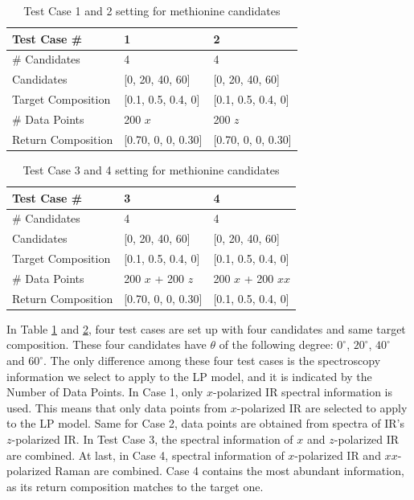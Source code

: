 \begin{table} 
\begin{center}
\begin{tabular}{| l | l | l |  }
\hline
Test Case \# & 1 & 2 \\
\hline
\# Candidates & 4 & 4 \\
\hline
Candidates & [0, 20, 40, 60] & [0, 20, 40, 60] \\
\hline
Target Composition & [0.1, 0.5, 0.4, 0] & [0.1, 0.5, 0.4, 0] \\
\hline
\# Data Points & 200 $x$ & 200 $z$ \\
\hline
Return Composition & [0.70, 0, 0, 0.30] & [0.70, 0, 0, 0.30] \\
\hline
\end{tabular} 
\end{center}
\caption{Test Case 1 and 2 setting for methionine candidates} 
\label{tab:4.1}
\end{table}	

\begin{table} 
\begin{center}
\begin{tabular}{| l | l | l | }
\hline
Test Case \# & 3 & 4 \\
\hline
\# Candidates & 4 & 4  \\
\hline
Candidates & [0, 20, 40, 60] & [0, 20, 40, 60]\\
\hline
Target Composition & [0.1, 0.5, 0.4, 0] & [0.1, 0.5, 0.4, 0]\\
\hline
\# Data Points & 200 $x$ + 200 $z$ & 200 $x$ + 200 $xx$\\
\hline
Return Composition & [0.70, 0, 0, 0.30] & [0.1, 0.5, 0.4, 0]\\
\hline
\end{tabular} 
\end{center}
\caption{Test Case 3 and 4 setting for methionine candidates} 
\label{tab:case3and4}
\end{table}	

In Table \ref{tab:4.1} and \ref{tab:case3and4}, four test cases are set up with four candidates and same target composition. These four candidates have $\theta$ of the following degree: $0^{\circ}$, $20^{\circ}$, $40^{\circ}$ and $60^{\circ}$. The only difference among these four test cases is the spectroscopy information we select to apply to the LP model, and it is indicated by the Number of Data Points. In Case 1, only $x$-polarized IR spectral information is used. This means that only data points from $x$-polarized IR are selected to apply to the LP model. Same for Case 2, data points are obtained from spectra of IR's $z$-polarized IR. In Test Case 3, the spectral information of $x$ and $z$-polarized IR are combined. At last, in Case 4, spectral information of $x$-polarized IR and $xx$-polarized Raman are combined. Case 4 contains the most abundant information, as its return composition matches to the target one. \\

